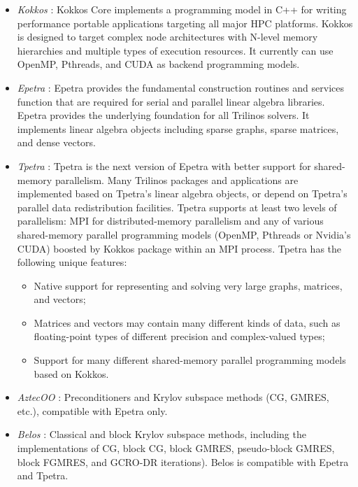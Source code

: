 {\begin{itemize}
	\item \textit{Kokkos} \cite{edwards2014kokkos}: Kokkos Core implements a programming model in C++ for writing performance portable applications targeting all major HPC platforms. Kokkos is designed to target complex node architectures with N-level memory hierarchies and multiple types of execution resources. It currently can use OpenMP, Pthreads, and CUDA as backend programming models.
	
	\item \textit{Epetra} \cite{heroux2005epetra}: Epetra provides the fundamental construction routines and services function that are required for serial and parallel linear algebra libraries. Epetra provides the underlying foundation for all Trilinos solvers. It implements linear algebra objects including sparse graphs, sparse matrices, and dense vectors.  
	
	\item \textit{Tpetra} \cite{baker2012tpetra}: Tpetra is the next version of Epetra with better support for shared-memory parallelism. Many Trilinos packages and applications  are implemented based on Tpetra’s linear algebra objects, or depend on Tpetra’s parallel data redistribution facilities. Tpetra supports at least two levels of parallelism: MPI  for distributed-memory parallelism and any of various shared-memory parallel programming models (OpenMP, Pthreads or Nvidia’s CUDA) boosted by Kokkos package within an MPI process.  Tpetra has the following unique features:
	
	\begin{itemize}
		\item Native support for representing and solving very large graphs, matrices, and vectors;
		\item Matrices and vectors may contain many different kinds of data, such as floating-point types of different precision and complex-valued types;
		\item Support for many different shared-memory parallel programming models based on Kokkos.
	\end{itemize}
	
	\item \textit{AztecOO} \cite{heroux2004aztecoo}: Preconditioners and Krylov subspace methods (CG, GMRES, etc.), compatible with Epetra only.
	
	\item \textit{Belos} \cite{bavier2012amesos2}: Classical and block Krylov subspace methods, including the implementations of CG, block CG, block GMRES, pseudo-block GMRES, block  FGMRES, and GCRO-DR iterations). Belos is compatible with Epetra and Tpetra.
	

\end{itemize}}
